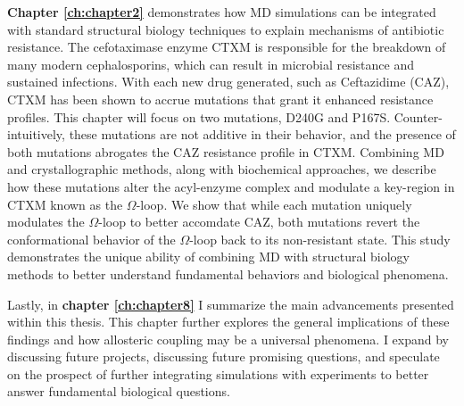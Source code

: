 \documentclass[../main.tex]{subfiles}
\begin{document}
	\textbf{Chapter \ref{ch:chapter2}} demonstrates how MD simulations can be integrated with standard structural biology techniques to explain mechanisms of antibiotic resistance. The cefotaximase enzyme CTXM is responsible for the breakdown of many modern cephalosporins, which can result in microbial resistance and sustained infections. With each new drug generated, such as Ceftazidime (CAZ), CTXM has been shown to accrue mutations that grant it enhanced resistance profiles. This chapter will focus on two mutations, D240G and P167S. Counter-intuitively, these mutations are not additive in their behavior, and the presence of both mutations abrogates the CAZ resistance profile in CTXM. Combining MD and crystallographic methods, along with biochemical approaches, we describe how these mutations alter the acyl-enzyme complex and modulate a key-region in CTXM known as the $\Omega$-loop. We show that while each mutation uniquely modulates the $\Omega$-loop to better accomdate CAZ, both mutations revert the conformational behavior of the $\Omega$-loop back to its non-resistant state. This study demonstrates the unique ability of combining MD with structural biology methods to better understand fundamental behaviors and biological phenomena.

	Lastly, in \textbf{chapter \ref{ch:chapter8}} I summarize the main advancements presented within this thesis. This chapter further explores the general implications of these findings and how allosteric coupling may be a universal phenomena. I expand by discussing future projects, discussing future promising questions, and speculate on the prospect of further integrating simulations with experiments to better answer fundamental biological questions. 

% 
% 
\end{document}
